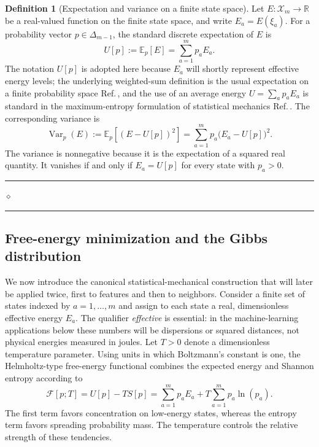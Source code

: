 \documentclass[11pt,a4paper]{article}
\newcommand{\Var}{\operatorname{Var}}
\theoremstyle{definition}
\newtheorem{definition}{Definition}[section]
\theoremstyle{plain}
\newcommand{\definitionseparator}{%
    \par\nobreak\vspace{0.15em}%
    \noindent\hfill
    \rule{0.19\linewidth}{0.30pt}%
    \hspace{0.65em}%
    {\scriptsize$\diamond$}%
    \hspace{0.65em}%
    \rule{0.19\linewidth}{0.30pt}%
    \hfill\mbox{}%
    \par\vspace{0.35em}%
}
\begin{document}
\begin{definition}[Expectation and variance on a finite state space]
\label{def:expectation_variance}
Let $E:\mathcal{X}_m\to\mathbb{R}$ be a real-valued function on the finite state space, and write $E_a=E(\xi_a)$. For a probability vector $p\in\Delta_{m-1}$, the standard discrete expectation of $E$ is
\begin{equation}
    U[p]
    :=\mathbb{E}_p[E]
    =\sum_{a=1}^{m}p_aE_a.
    \label{eq:mean_energy_definition}
\end{equation}
The notation $U[p]$ is adopted here because $E_a$ will shortly represent effective energy levels; the underlying weighted-sum definition is the usual expectation on a finite probability space Ref.\,\cite{cover2006}, and the use of an average energy $U=\sum_a p_aE_a$ is standard in the maximum-entropy formulation of statistical mechanics Ref.\,\cite{jaynes1957}. The corresponding variance is
\begin{equation}
    \Var_p(E)
    :=\mathbb{E}_p\!\left[(E-U[p])^2\right]
    =\sum_{a=1}^{m}p_a\bigl(E_a-U[p]\bigr)^2.
    \label{eq:energy_variance_definition}
\end{equation}
The variance is nonnegative because it is the expectation of a squared real quantity. It vanishes if and only if $E_a=U[p]$ for every state with $p_a>0$.
\end{definition}
\definitionseparator

\subsection{Free-energy minimization and the Gibbs distribution}
\label{subsec:canonical}

We now introduce the canonical statistical-mechanical construction that will later be applied twice, first to features and then to neighbors. Consider a finite set of states indexed by $a=1,\ldots,m$ and assign to each state a real, dimensionless effective energy $E_a$. The qualifier \emph{effective} is essential: in the machine-learning applications below these numbers will be dispersions or squared distances, not physical energies measured in joules. Let $T>0$ denote a dimensionless temperature parameter. Using units in which Boltzmann's constant is one, the Helmholtz-type free-energy functional combines the expected energy and Shannon entropy according to
\begin{equation}
    \mathcal{F}[p;T]
    =U[p]-T S[p]
    =\sum_{a=1}^{m}p_aE_a
      +T\sum_{a=1}^{m}p_a\ln\left(p_a\right).
    \label{eq:free_energy}
\end{equation}
The first term favors concentration on low-energy states, whereas the entropy term favors spreading probability mass. The temperature controls the relative strength of these tendencies.
\end{document}

